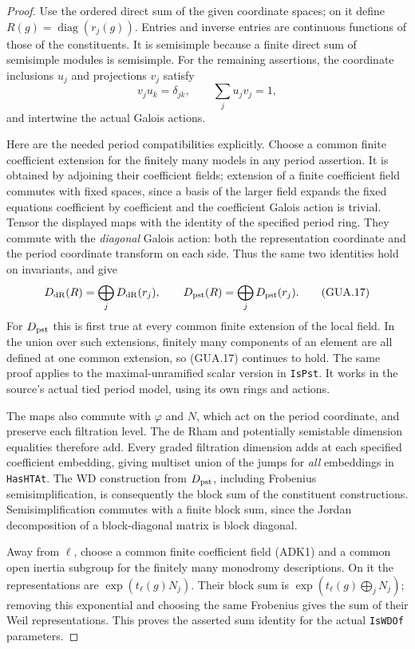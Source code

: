 \begin{proof}
Use the ordered direct sum of the given coordinate spaces;
on it define $R(g)=\operatorname{diag}(r_j(g))$.
Entries and inverse entries are continuous functions of
those of the constituents.  It is semisimple because a
finite direct sum of semisimple modules is semisimple.
For the remaining assertions, the coordinate inclusions
$u_j$ and projections $v_j$ satisfy
\[
 v_j u_k=\delta_{jk},\qquad \sum_j u_jv_j=1,
\]
and intertwine the actual Galois actions.

Here are the needed period compatibilities explicitly.
Choose a common finite coefficient extension for the
finitely many models in any period assertion.  It is
obtained by adjoining their coefficient fields; extension
of a finite coefficient field commutes with fixed spaces,
since a basis of the larger field expands the fixed
equations coefficient by coefficient and the coefficient
Galois action is trivial.  Tensor the displayed maps with
the identity of the specified period ring.  They commute
with the \emph{diagonal} Galois action: both the
representation coordinate and the period coordinate
transform on each side.  Thus the same two identities
hold on invariants, and give
\[
 D_{\rm dR}(R)=\bigoplus_jD_{\rm dR}(r_j),\qquad
 D_{\rm pst}(R)=\bigoplus_jD_{\rm pst}(r_j).        \tag{GUA.17}
\]
For $D_{\rm pst}$ this is first true at every common
finite extension of the local field.  In the union over
such extensions, finitely many components of an element
are all defined at one common extension, so (GUA.17)
continues to hold.  The same proof applies to the
maximal-unramified scalar version in \texttt{IsPst}.
It works in the source's actual tied period model,
using its own rings and actions.

The maps also commute with $\varphi$ and $N$, which
act on the period coordinate, and preserve each
filtration level.  The de Rham and potentially
semistable dimension equalities therefore add.
Every graded filtration dimension adds at each
specified coefficient embedding, giving multiset union
of the jumps for \emph{all} embeddings in
\texttt{HasHTAt}.  The WD construction from
$D_{\rm pst}$, including Frobenius semisimplification,
is consequently the block sum of the constituent
constructions.  Semisimplification commutes with a
finite block sum, since the Jordan decomposition of a
block-diagonal matrix is block diagonal.

Away from $\ell$, choose a common finite coefficient
field (ADK1) and a common open inertia subgroup for
the finitely many monodromy descriptions.  On it the
representations are $\exp(t_\ell(g)N_j)$.
Their block sum is $\exp(t_\ell(g)\bigoplus_jN_j)$;
removing this exponential and choosing the same
Frobenius gives the sum of their Weil representations.
This proves the asserted sum identity for the actual
\texttt{IsWDOf} parameters.


\end{proof}
